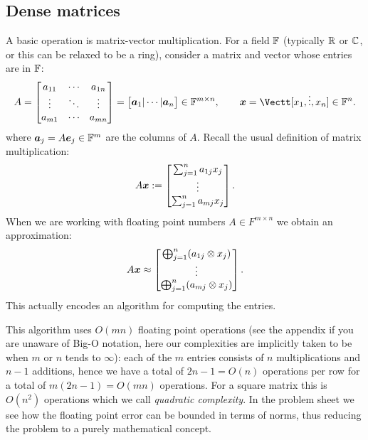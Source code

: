 \subsection{Dense matrices}
A basic operation is matrix-vector multiplication. For a field ${\mathbb F}$ (typically ${\mathbb R}$ or ${\mathbb C}$, or this can be relaxed to be a ring), consider a matrix and vector whose entries are in ${\mathbb F}$:
\[
A = \begin{bmatrix}
a_{11} & \ensuremath{\cdots} & a_{1n} \\
\ensuremath{\vdots} & \ensuremath{\ddots} & \ensuremath{\vdots} \\
a_{m1} & \ensuremath{\cdots} & a_{mn}
\end{bmatrix} = \begin{bmatrix} \ensuremath{\bm{\a}}_1 | \ensuremath{\cdots} | \ensuremath{\bm{\a}}_n \end{bmatrix} \ensuremath{\in} \ensuremath{\bbF}^{m \ensuremath{\times} n}, \qquad
\ensuremath{\bm{\x}} = \Vectt[x_1,\ensuremath{\vdots},x_n] \ensuremath{\in} \ensuremath{\bbF}^n.
\]
where $\bm{{\mbox{\boldmath$a$\unboldmath}}}_j = A \bm{{\mbox{\boldmath$e$\unboldmath}}}_j \in {\mathbb F}^m$ are the columns of $A$. Recall the usual definition of matrix multiplication:
\[
A\bm{{\mbox{\boldmath$x$\unboldmath}}} := \begin{bmatrix} \sum_{j=1}^n a_{1j} x_j \\ \vdots \\ \sum_{j=1}^n a_{mj} x_j \end{bmatrix}.
\]
When we are working with floating point numbers $A \ensuremath{\in} F^{m \ensuremath{\times} n}$ we obtain an approximation:
\[
A\bm{{\mbox{\boldmath$x$\unboldmath}}} \approx \begin{bmatrix} \bigoplus_{j=1}^n (a_{1j}  \otimes x_j) \\ \vdots \\  \bigoplus_{j=1}^n (a_{mj}  \otimes x_j) \end{bmatrix}.
\]
This actually encodes an algorithm for computing the entries.

This algorithm uses $O(m n)$ floating point operations (see the appendix if you are unaware of Big-O notation, here our complexities are implicitly taken to be when $m$ or $n$ tends to $\ensuremath{\infty}$): each of the $m$ entries consists of $n$ multiplications and $n-1$ additions, hence we have a total of $2n-1 = O(n)$ operations per row for a total of $m(2n-1) = O(mn)$ operations. For a square matrix this is $O(n^2)$ operations which we call \emph{quadratic complexity}. In the problem sheet we see how the floating point error can be bounded in terms of norms, thus reducing the problem to a purely mathematical concept.

